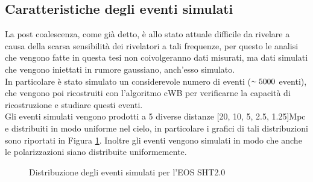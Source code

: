 \subsection{Caratteristiche degli eventi simulati}
\label{subsection:cwb_injections}
La post coalescenza, come già detto, è allo stato attuale difficile da rivelare a causa della scarsa sensibilità dei rivelatori a tali frequenze, per questo le analisi che vengono fatte in questa tesi non coivolgeranno dati misurati, ma dati simulati che vengono iniettati in rumore gaussiano, anch'esso simulato.\\
In particolare è stato simulato un considerevole numero di eventi ($\smallsim 5000$ eventi), che vengono poi ricostruiti con l'algoritmo cWB per verificarne la capacità di ricostruzione e studiare questi eventi.\\
Gli eventi simulati vengono prodotti a 5 diverse distanze [20, 10, 5, 2.5, 1.25]Mpc e distribuiti in modo uniforme nel cielo, in particolare i grafici di tali distribuzioni sono riportati in Figura \ref{fig:skypos}. Inoltre gli eventi vengono simulati in modo che anche le polarizzazioni siano distribuite uniformemente.
\begin{figure}[ht]
	\vspace{-20pt}
	\centering
	\quad
	\vspace{-5pt}
	\caption{Distribuzione degli eventi simulati per l'EOS SHT2.0}
	\label{fig:skypos}
	\vspace{-10pt}
\end{figure}
